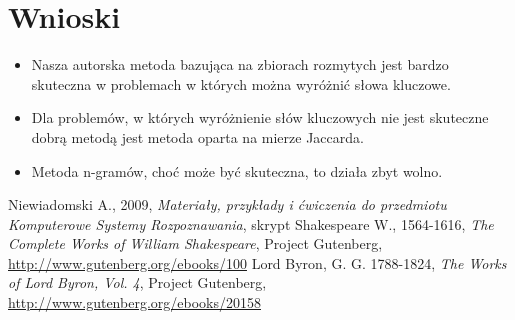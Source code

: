 \documentclass[a4paper]{classrep}
\begin{document}
\section{Wnioski}
\begin{itemize}
\item Nasza autorska metoda bazująca na zbiorach rozmytych jest bardzo skuteczna w problemach w których można wyróżnić słowa kluczowe.
\item Dla problemów, w których wyróżnienie słów kluczowych nie jest skuteczne dobrą metodą jest metoda oparta na mierze Jaccarda.
\item Metoda n-gramów, choć może być skuteczna, to działa zbyt wolno.
\end{itemize}


\begin{thebibliography}{2}
 Niewiadomski A., 2009, \textit{Materiały, przykłady i ćwiczenia do przedmiotu Komputerowe Systemy Rozpoznawania}, skrypt
 Shakespeare W., 1564-1616, \textit{The Complete Works of William Shakespeare}, Project Gutenberg, \url{http://www.gutenberg.org/ebooks/100}
 Lord Byron, G. G. 1788-1824, \textit{The Works of Lord Byron, Vol. 4}, Project Gutenberg, \url{http://www.gutenberg.org/ebooks/20158}
\end{thebibliography}
\end{document}
